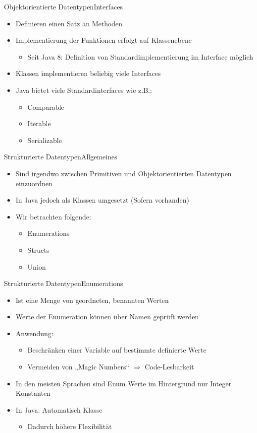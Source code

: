 \begin{frame}{Objektorientierte Datentypen}{Interfaces}
	\begin{itemize}
		\item Definieren einen Satz an Methoden
		\item Implementierung der Funktionen erfolgt auf Klassenebene
		\begin{itemize}
			\item Seit Java 8: Definition von Standardimplementierung im Interface möglich
		\end{itemize}
		\item Klassen implementieren beliebig viele Interfaces
		\item Java bietet viele Standardinterfaces wie z.B.:
		\begin{itemize}
			\item Comparable
			\item Iterable
			\item Serializable
		\end{itemize}
	\end{itemize}
\end{frame}

\begin{frame}{Strukturierte Datentypen}{Allgemeines}
	\begin{itemize}
		\item Sind irgendwo zwischen Primitiven und Objektorientierten Datentypen einzuordnen
		\item In Java jedoch als Klassen umgesetzt (Sofern vorhanden)
		\item Wir betrachten folgende:
		\begin{itemize}
			\item Enumerations
			\item Structs
			\item Union
		\end{itemize}
	\end{itemize}
\end{frame}

\begin{frame}{Strukturierte Datentypen}{Enumerations}
	\begin{itemize}
		\item Ist eine Menge von geordneten, benannten Werten
		\item Werte der Enumeration können über Namen geprüft werden
		\item Anwendung:
		\begin{itemize}
			\item Beschränken einer Variable auf bestimmte definierte Werte
			\item Vermeiden von „Magic Numbers“ $\Rightarrow$ Code-Lesbarkeit
		\end{itemize}
		\item In den meisten Sprachen sind Enum Werte im Hintergrund nur Integer Konstanten
		\item In Java: Automatisch Klasse
		\begin{itemize}
			\item Dadurch höhere Flexibilität
		\end{itemize}
	\end{itemize}
\end{frame}

